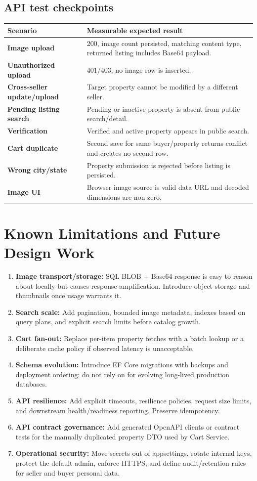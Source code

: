 \documentclass[10pt,a4paper]{article}
\newcommand{\code}[1]{\texttt{\detokenize{#1}}}
\begin{document}
\subsection{API test checkpoints}
\begin{tabularx}{\textwidth}{>{\bfseries}p{34mm} X}
\toprule
Scenario & Measurable expected result\\
\midrule
Image upload & 200, image count persisted, matching content type, returned listing includes Base64 payload.\\
Unauthorized upload & 401/403; no image row is inserted.\\
Cross-seller update/upload & Target property cannot be modified by a different seller.\\
Pending listing search & Pending or inactive property is absent from public search/detail.\\
Verification & Verified and active property appears in public search.\\
Cart duplicate & Second save for same buyer/property returns conflict and creates no second row.\\
Wrong city/state & Property submission is rejected before listing is persisted.\\
Image UI & Browser image source is valid data URL and decoded dimensions are non-zero.\\
\bottomrule
\end{tabularx}

\section{Known Limitations and Future Design Work}
\begin{enumerate}
  \item \textbf{Image transport/storage:} SQL BLOB + Base64 response is easy to reason
  about locally but causes response amplification. Introduce object storage and
  thumbnails once usage warrants it.
  \item \textbf{Search scale:} Add pagination, bounded image metadata, indexes based
  on query plans, and explicit search limits before catalog growth.
  \item \textbf{Cart fan-out:} Replace per-item property fetches with a batch lookup
  or a deliberate cache policy if observed latency is unacceptable.
  \item \textbf{Schema evolution:} Introduce EF Core migrations with backups and
  deployment ordering; do not rely on \code{EnsureCreatedAsync()} for evolving
  long-lived production databases.
  \item \textbf{API resilience:} Add explicit timeouts, resilience policies, request
  size limits, and downstream health/readiness reporting. Preserve idempotency.
  \item \textbf{API contract governance:} Add generated OpenAPI clients or contract
  tests for the manually duplicated property DTO used by Cart Service.
  \item \textbf{Operational security:} Move secrets out of appsettings, rotate
  internal keys, protect the default admin, enforce HTTPS, and define audit/retention
  rules for seller and buyer personal data.
\end{enumerate}
\end{document}
